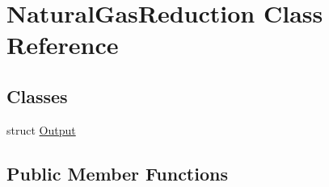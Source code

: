 \hypertarget{class_natural_gas_reduction}{}\section{Natural\+Gas\+Reduction Class Reference}
\label{class_natural_gas_reduction}
\subsection*{Classes}
\begin{DoxyCompactItemize}
\item 
struct \hyperlink{struct_natural_gas_reduction_1_1_output}{Output}
\end{DoxyCompactItemize}
\subsection*{Public Member Functions}
